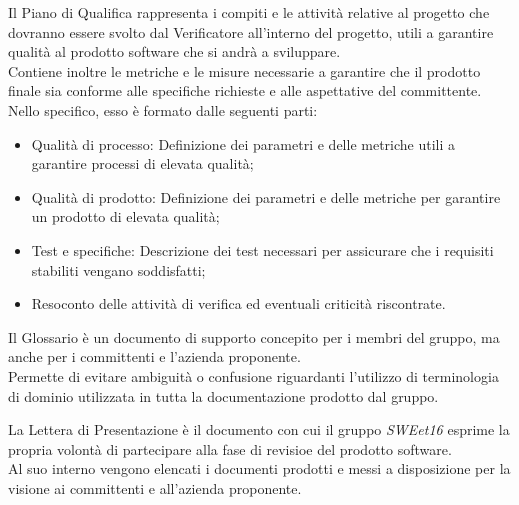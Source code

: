 
    Il Piano di Qualifica rappresenta i compiti e le attività relative al progetto che dovranno essere svolto dal Verificatore all'interno del progetto,
    utili a garantire qualità al prodotto software che si andrà a sviluppare. \\
    Contiene inoltre le metriche e le misure necessarie a garantire che il prodotto finale sia conforme alle specifiche richieste e alle aspettative del committente. \\

    Nello specifico, esso è formato dalle seguenti parti:
    \begin{itemize}
        \item Qualità di processo: Definizione dei parametri e delle metriche utili a garantire processi di elevata qualità;
        \item Qualità di prodotto: Definizione dei parametri e delle metriche per garantire un prodotto di elevata qualità;
        \item Test e specifiche: Descrizione dei test necessari per assicurare che i requisiti stabiliti vengano soddisfatti;
        \item Resoconto delle attività di verifica ed eventuali criticità riscontrate.
    \end{itemize}



    Il Glossario è un documento di supporto concepito per i membri del gruppo, ma anche per i committenti e l'azienda proponente. \\
    Permette di evitare ambiguità o confusione riguardanti l'utilizzo di terminologia di dominio utilizzata in tutta la documentazione prodotto dal gruppo.



    La Lettera di Presentazione è il documento con cui il gruppo \textit{SWEet16} esprime la propria volontà di partecipare alla fase di revisioe del prodotto software. \\
    Al suo interno vengono elencati i documenti prodotti e messi a disposizione per la visione ai committenti e all'azienda proponente.

